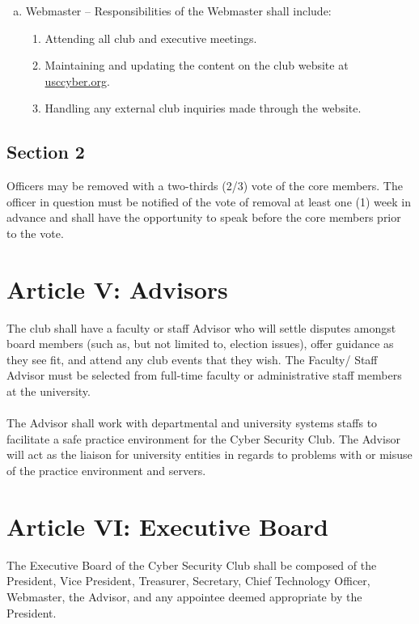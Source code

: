 \documentclass[10pt]{article}
\begin{document}
\begin{enumerate}[(a)]
\begin{enumerate}[1.]
    \end{enumerate}
    \item Webmaster -- Responsibilities of the Webmaster shall include:
    \begin{enumerate}[1.]
        \item Attending all club and executive meetings.
        \item Maintaining and updating the content on the club website at \url{usccyber.org}.
        \item Handling any external club inquiries made through the website.
    \end{enumerate}
\end{enumerate}
\subsection*{Section 2}
Officers may be removed with a two-thirds (2/3) vote of the core members. The officer in question
must be notified of the vote of removal at least one (1) week in advance and shall have the opportunity
to speak before the core members prior to the vote.
\vspace{0.2in}

\section*{Article V: Advisors}
The club shall have a faculty or staff Advisor who will settle disputes amongst board members (such as,
but not limited to, election issues), offer guidance as they see fit, and attend any club events that they
wish. The Faculty/ Staff Advisor must be selected from full-time faculty or administrative staff
members at the university.\\\\
The Advisor shall work with departmental and university systems staffs to facilitate a safe practice
environment for the Cyber Security Club. The Advisor will act as the liaison for university entities in
regards to problems with or misuse of the practice environment and servers.
\vspace{0.2in}

\section*{Article VI: Executive Board}
The Executive Board of the Cyber Security Club shall be composed of the President, Vice President,
Treasurer, Secretary, Chief Technology Officer, Webmaster, the Advisor, and any appointee deemed appropriate by
the President.
\vspace{0.2in}
\end{document}
